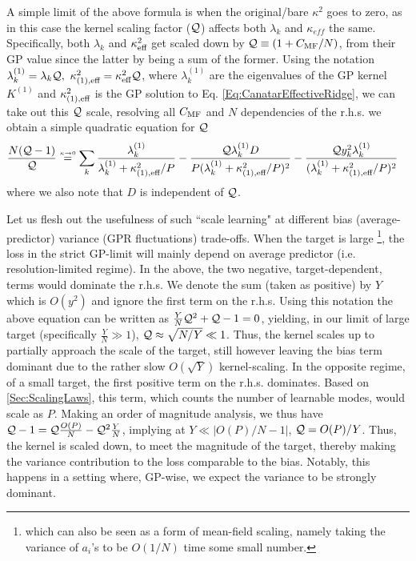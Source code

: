 A simple limit of the above formula is when the original/bare $\kappa^2$ goes to zero, as in this case the kernel scaling factor (${\cal Q}$) affects both $\lambda_k$ and $\kappa_{eff}$ the same. Specifically, both $\lambda_k$ and $\kappa_{\text{eff}}^2$ get scaled down by ${\cal Q}\equiv (1+C_{\text{MF}}/N)$, from their GP value since the latter by being a sum of the former. Using the notation $\lambda_{k}^{(1)} = \lambda_k {\cal Q},\ \kappa^{2}_{(1),\text{eff}} = \kappa_{\text{eff}}^{2}{\cal Q}$, where $\lambda_{k}^{(1)}$ are the eigenvalues of the GP kernel $K^{(1)}$ and $\kappa^{2}_{(1),\text{eff}}$ is the GP solution to Eq. \ref{Eq:CanatarEffectiveRidge}, we can take out this ${\cal Q}$ scale, resolving all $C_{\text{MF}}$ and $N$ dependencies of the r.h.s. we obtain a simple quadratic equation for ${\cal Q}$
\begin{align}
\frac{N({\cal Q}-1)}{{\cal Q}} &\stackrel{{\scriptscriptstyle \kappa\rightarrow0}}{=} \sum_k \frac{\lambda_{k}^{(1)}}{\lambda_{k}^{(1)} + \kappa^{2}_{(1),\text{eff}}/P} - \frac{{\cal Q}\lambda_{k}^{(1)}D }{P(\lambda_{k}^{(1)}+\kappa^{2}_{(1),\text{eff}}/P)^2}- \frac{{\cal Q} y_k^2  \lambda_{k}^{(1)}}{(\lambda_{k}^{(1)}+\kappa^{2}_{(1),\text{eff}}/P)^2}
\end{align}
where we also note that $D$ is independent of ${\cal Q}$. 

Let us flesh out the usefulness of such ``scale learning" at different bias (average-predictor) variance (GPR fluctuations) trade-offs. When the target is large \footnote{which can also be seen as a form of mean-field scaling, namely taking the variance of $a_i$'s to be   $O(1/N)$ time some small number.}, the loss in the strict GP-limit will mainly depend on average predictor (i.e. resolution-limited regime). In the above, the two negative, target-dependent, terms would dominate the r.h.s. We denote the sum (taken as positive) by $Y$ which is $O(y^2)$ and ignore the first term on the r.h.s. Using this notation the above equation can be written as $\frac{Y}{N}{\cal Q}^2+{\cal Q}-1=0$, yielding, in our limit of large target (specifically $\frac{Y}{N}\gg 1$), ${\cal Q} \approx \sqrt{N/Y} \ll 1$. Thus, the kernel scales up to partially approach the scale of the target, still however leaving the bias term dominant due to the rather slow $O(\sqrt{Y})$ kernel-scaling. In the opposite regime, of a small target, the first positive term on the r.h.s. dominates. Based on \ref{Sec:ScalingLaws}, this term, which counts the number of learnable modes, would scale as $P$. Making an order of magnitude analysis, we thus have ${\cal Q}-1={\cal Q} \frac{O(P)}{N}-{\cal Q}^2 \frac{Y}{N}$, implying at $Y \ll |O(P)/N-1|$, ${\cal Q} = O(P)/Y$. Thus, the kernel is scaled down, to meet the magnitude of the target, thereby making the variance contribution to the loss comparable to the bias. Notably, this happens in a setting where, GP-wise, we expect the variance to be strongly dominant. 


